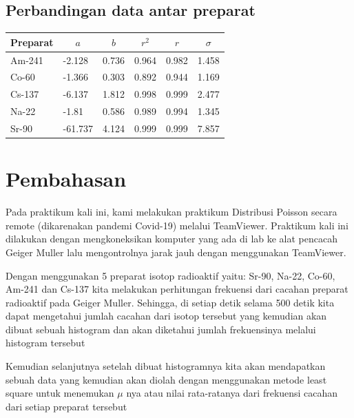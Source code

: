 \documentclass{article}
\begin{document}
			\subsection{Perbandingan data antar preparat}
				\begin{longtable}{@{}llllll@{}}
					\toprule
					Preparat &
					\multicolumn{1}{c}{$a$} &
					\multicolumn{1}{c}{$b$} &
					\multicolumn{1}{c}{$r^{2}$} &
					\multicolumn{1}{c}{$r$} &
					\multicolumn{1}{c}{$\sigma$} \\* \midrule
					\endfirsthead
					\endhead
					\bottomrule
					\endfoot
					\endlastfoot
					Am-241 & -2.128  & 0.736 & 0.964 & 0.982 & 1.458 \\
					Co-60  & -1.366  & 0.303 & 0.892 & 0.944 & 1.169 \\
					Cs-137 & -6.137  & 1.812 & 0.998 & 0.999 & 2.477 \\
					Na-22  & -1.81   & 0.586 & 0.989 & 0.994 & 1.345 \\
					Sr-90  & -61.737 & 4.124 & 0.999 & 0.999 & 7.857 \\* \bottomrule
				\end{longtable}
			
	
	\section{Pembahasan}
	
		\hspace{0.35 cm} Pada praktikum kali ini, kami melakukan praktikum Distribusi Poisson secara remote (dikarenakan pandemi Covid-19) melalui TeamViewer. Praktikum kali ini dilakukan dengan mengkoneksikan komputer yang ada di lab ke alat pencacah Geiger Muller lalu mengontrolnya jarak jauh dengan menggunakan TeamViewer.
		
		\par Dengan menggunakan 5 preparat isotop radioaktif yaitu: Sr-90, Na-22, Co-60, Am-241 dan Cs-137 kita melakukan perhitungan frekuensi dari cacahan preparat radioaktif pada Geiger Muller. Sehingga, di setiap detik selama 500 detik kita dapat mengetahui jumlah cacahan dari isotop tersebut yang kemudian akan dibuat sebuah histogram dan akan diketahui jumlah frekuensinya melalui histogram tersebut
		
		\par Kemudian selanjutnya setelah dibuat histogramnya kita akan mendapatkan sebuah data yang kemudian akan diolah dengan menggunakan metode least square untuk menemukan $\mu$ nya atau nilai rata-ratanya dari frekuensi cacahan dari setiap preparat tersebut
		
\end{document}
